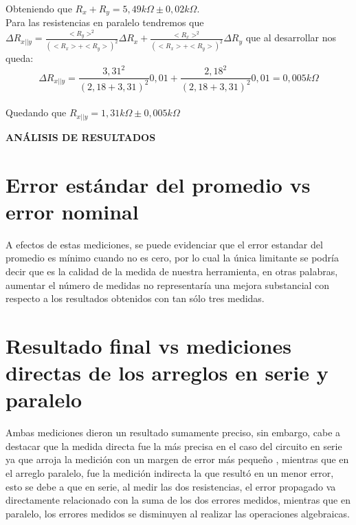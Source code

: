 \documentclass[12pt]{article}
\begin{document}
	\noindent Obteniendo que $R_x + R_y = 5,49k\Omega \pm 0,02k\Omega$.\\
	
	\noindent Para las resistencias en paralelo tendremos que $\Delta R_{x||y} = \frac{<R_y>^2}{(<R_x> + <R_y>)^2}\Delta R_x + \frac{<R_x>^2}{(<R_x> + <R_y>)^2}\Delta R_y$ que al desarrollar nos queda:\\
	
	\begin{equation}
		\Delta R_{x||y} = \frac{3,31^2}{(2,18 + 3,31)^2}0,01 + \frac{2,18^2}{(2,18 + 3,31)^2}0,01 = 0,005k\Omega
	\end{equation}
	\\
	
	\noindent Quedando que $R_{x||y} = 1,31k\Omega \pm 0,005k\Omega$
	
	\newpage
	
	\begin{center}
		\textbf{\large ANÁLISIS DE RESULTADOS}\\
	\end{center}
	
	\section*{Error estándar del promedio vs error nominal}
	
	\noindent A efectos de estas mediciones, se puede evidenciar que el error estandar del promedio es mínimo cuando no es cero, por lo cual la única limitante se podría decir que es la calidad de la medida de nuestra herramienta, en otras palabras, aumentar el número de medidas no representaría una mejora substancial con respecto a los resultados obtenidos con tan sólo tres medidas. \\
	
	\section*{Resultado final vs mediciones directas de los arreglos en serie y paralelo}
	
	\noindent Ambas mediciones dieron un resultado sumamente preciso, sin embargo, cabe a destacar que la medida directa fue la más precisa en el caso del circuito en serie ya que arroja la medición con un margen de error más pequeño , mientras que en el arreglo paralelo, fue la medición indirecta la que resultó en un menor error, esto se debe a que en serie,  al medir las dos resistencias, el error propagado va directamente relacionado con la suma de los dos errores medidos, mientras que en paralelo, los errores medidos se disminuyen al realizar las operaciones algebraicas.\\
	
\end{document}
